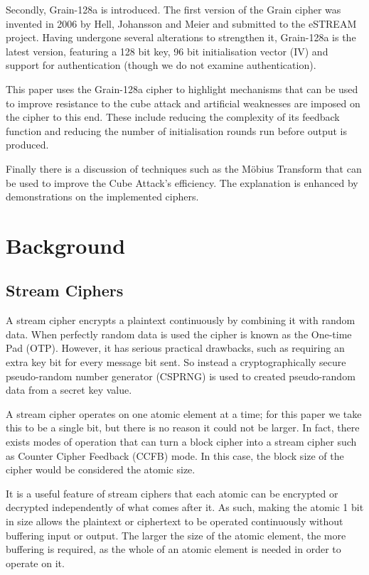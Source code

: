 \documentclass{report}
\let\Oldsection\section
\renewcommand{\section}{\FloatBarrier\Oldsection}
\begin{document}
Secondly, Grain-128a is introduced. The first version of the Grain cipher was invented in 2006 by Hell, Johansson and Meier \cite{Grain128aSpec} and submitted to the eSTREAM project. Having undergone several alterations to strengthen it, Grain-128a is the latest version, featuring a 128 bit key, 96 bit initialisation vector (IV) and support for authentication (though we do not examine authentication).

This paper uses the Grain-128a cipher to highlight mechanisms that can be used to improve resistance to the cube attack and artificial weaknesses are imposed on the cipher to this end. These include reducing the complexity of its feedback function and reducing the number of initialisation rounds run before output is produced.

Finally there is a discussion of techniques such as the M\"{o}bius Transform that can be used to improve the Cube Attack's efficiency. The explanation is enhanced by demonstrations on the implemented ciphers.

\chapter{Background}
\section{Stream Ciphers}
A stream cipher encrypts a plaintext continuously by combining it with random data. When perfectly random data is used the cipher is known as the One-time Pad (OTP)\cite{otpDef}. However, it has serious practical drawbacks, such as requiring an extra key bit for every message bit sent\cite{otpDef}. So instead a cryptographically secure pseudo-random number generator (CSPRNG) is used to created pseudo-random data from a secret key value.

A stream cipher operates on one atomic element at a time; for this paper we take this to be a single bit, but there is no reason it could not be larger. In fact, there exists modes of operation that can turn a block cipher into a stream cipher such as Counter Cipher Feedback (CCFB) mode\cite{counterMode}. In this case, the block size of the cipher would be considered the atomic size.

It is a useful feature of stream ciphers that each atomic can be encrypted or decrypted independently of what comes after it. As such, making the atomic 1 bit in size allows the plaintext or ciphertext to be operated continuously without buffering input or output. The larger the size of the atomic element, the more buffering is required, as the whole of an atomic element is needed in order to operate on it.
\end{document}
